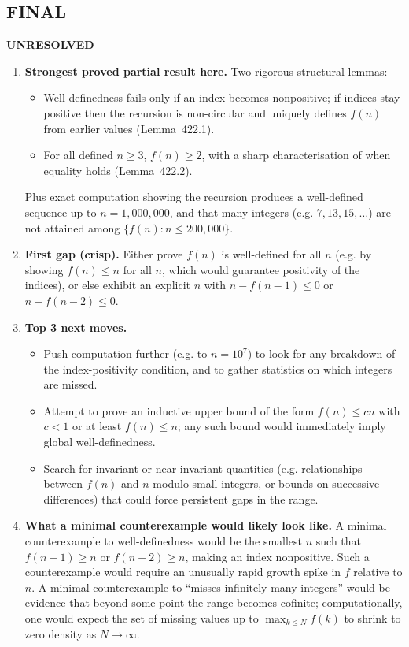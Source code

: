 \subsection*{FINAL}
\textbf{UNRESOLVED}
\begin{enumerate}
\item[(i)] \textbf{Strongest proved partial result here.}
Two rigorous structural lemmas:
\begin{itemize}
\item Well-definedness fails only if an index becomes nonpositive; if indices stay positive then the recursion is non-circular and uniquely defines $f(n)$ from earlier values (Lemma~422.1).
\item For all defined $n\ge 3$, $f(n)\ge 2$, with a sharp characterisation of when equality holds (Lemma~422.2).
\end{itemize}
Plus exact computation showing the recursion produces a well-defined sequence up to $n=1{,}000{,}000$, and that many integers (e.g. $7,13,15,\dots$) are not attained among $\{f(n):n\le 200{,}000\}$.
\item[(ii)] \textbf{First gap (crisp).}
Either prove $f(n)$ is well-defined for all $n$ (e.g. by showing $f(n)\le n$ for all $n$, which would guarantee positivity of the indices), or else exhibit an explicit $n$ with $n-f(n-1)\le 0$ or $n-f(n-2)\le 0$.
\item[(iii)] \textbf{Top 3 next moves.}
\begin{itemize}
\item Push computation further (e.g. to $n=10^7$) to look for any breakdown of the index-positivity condition, and to gather statistics on which integers are missed.
\item Attempt to prove an inductive upper bound of the form $f(n)\le c n$ with $c<1$ or at least $f(n)\le n$; any such bound would immediately imply global well-definedness.
\item Search for invariant or near-invariant quantities (e.g. relationships between $f(n)$ and $n$ modulo small integers, or bounds on successive differences) that could force persistent gaps in the range.
\end{itemize}
\item[(iv)] \textbf{What a minimal counterexample would likely look like.}
A minimal counterexample to well-definedness would be the smallest $n$ such that $f(n-1)\ge n$ or $f(n-2)\ge n$, making an index nonpositive. Such a counterexample would require an unusually rapid growth spike in $f$ relative to $n$.
A minimal counterexample to ``misses infinitely many integers'' would be evidence that beyond some point the range becomes cofinite; computationally, one would expect the set of missing values up to $\max_{k\le N} f(k)$ to shrink to zero density as $N\to\infty$.
\end{enumerate}


